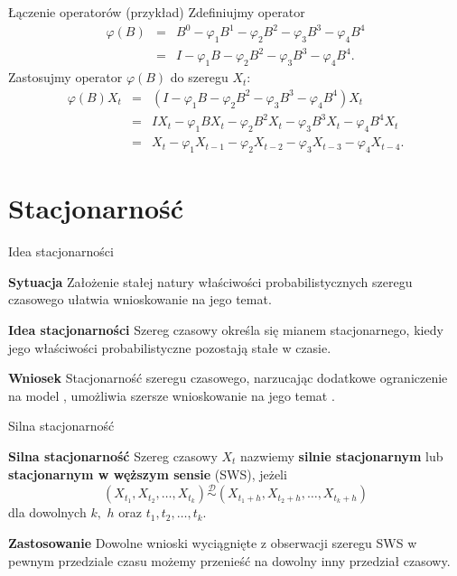 \documentclass[a4paper, 11pt]{beamer}
\begin{document}
	\begin{frame}{Łączenie operatorów (przykład)}
		Zdefiniujmy operator
		\begin{eqnarray*}
			\varphi\left(B\right) & = & B^{0} - \varphi_{1} B^{1} - \varphi_{2} B^{2} - \varphi_{3} B^{3} - \varphi_{4} B^{4}\\
				  & = & I - \varphi_{1} B - \varphi_{2} B^{2} - \varphi_{3} B^{3} - \varphi_{4} B^{4}.
		\end{eqnarray*}
		Zastosujmy operator $\varphi\left(B\right)$ do szeregu $X_{t}$:
		\begin{eqnarray*}
			\varphi\left(B\right) X_{t} & = & \left(I - \varphi_{1} B - \varphi_{2} B^{2} - \varphi_{3} B^{3} - \varphi_{4} B^{4}\right) X_{t}\\
				 & = & I X_{t} - \varphi_{1} B X_{t} - \varphi_{2} B^{2} X_{t} - \varphi_{3} B^{3} X_{t} - \varphi_{4} B^{4} X_{t}\\
				 & = & X_{t} - \varphi_{1} X_{t-1} - \varphi_{2} X_{t-2} - \varphi_{3} X_{t-3} - \varphi_{4} X_{t-4}.
		\end{eqnarray*}
	\end{frame}
	
	\section{Stacjonarność}

	\begin{frame}{Idea stacjonarności}
		\begin{alert}{\textbf{Sytuacja}}
			Założenie stałej natury właściwości probabilistycznych szeregu
			czasowego ułatwia wnioskowanie na jego temat.
		\end{alert}
		\begin{block}{\textbf{Idea stacjonarności}}
			Szereg czasowy określa się mianem stacjonarnego, kiedy jego 
			właściwości probabilistyczne pozostają stałe w czasie.
		\end{block}
		\begin{alert}{\textbf{Wniosek}}
			Stacjonarność szeregu czasowego, narzucając dodatkowe ograniczenie na 
			model \frownie, umożliwia szersze wnioskowanie na jego temat \smiley.
		\end{alert}
	\end{frame}
	
	\begin{frame}{Silna stacjonarność}
		\begin{block}{\textbf{Silna stacjonarność}}
			Szereg czasowy $X_t$ nazwiemy \textbf{silnie stacjonarnym} lub
			\textbf{stacjonarnym w węższym sensie} (SWS), jeżeli \[
				\left(X_{t_{1}}, X_{t_{2}}, \ldots, X_{t_{k}}\right)
				\overset{\mathcal{D}}{\sim}
				\left(X_{t_{1} + h}, X_{t_{2} + h}, \ldots, X_{t_{k} + h}\right)
			\]
			dla dowolnych $k,$ $h$ oraz $t_{1}, t_{2}, \ldots, t_{k}.$
		\end{block}
		\begin{alert}{\textbf{Zastosowanie}}
			Dowolne wnioski wyciągnięte z obserwacji szeregu SWS w 
			pewnym przedziale czasu możemy przenieść na dowolny inny przedział 
			czasowy.
		\end{alert}
	\end{frame}
	
\end{document}
